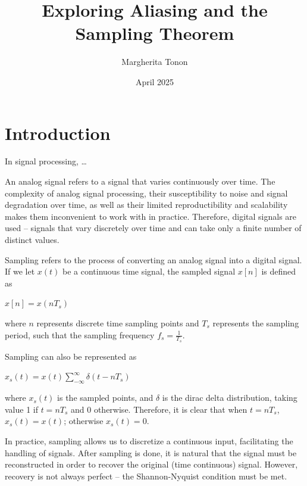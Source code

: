 \documentclass{article}
\title{Exploring Aliasing and the Sampling Theorem} %
\author{Margherita Tonon}
\date{April 2025}
\begin{document}
\maketitle

\section{Introduction}
In signal processing, \dots %

An analog signal refers to a signal that varies continuously over time. 
The complexity of analog signal processing, their susceptibility to noise and signal degradation over time, as well as their limited reproductibility and scalability makes them inconvenient to work with in practice. 
Therefore, digital signals are used -- signals that vary discretely over time and can take only a finite number of distinct values.

Sampling refers to the process of converting an analog signal into a digital signal. If we let $x(t)$ be a continuous time signal, the sampled signal $x[n]$ is defined as
\begin{center}
    \begin{math}
        x[n] = x(nT_s)
    \end{math}  
\end{center}
where $n$ represents discrete time sampling points and $T_s$ represents the sampling period, such that the sampling frequency $f_s = \frac{1}{T_s}$.

Sampling can also be represented as 
\begin{center}
    \begin{math}
        x_s(t) = x(t) \sum_{-\infty}^{\infty} \delta (t-nT_s)
    \end{math}  
\end{center}
where $x_s(t)$ is the sampled points, and $\delta$ is the dirac delta distribution, taking value 1 if $t=nT_s$ and 0 otherwise.
Therefore, it is clear that when $t=nT_s$, $x_s(t) = x(t)$; otherwise $x_s(t) = 0$. 

In practice, sampling allows us to discretize a continuous input, facilitating the handling of signals. After sampling is done, it is natural that the signal must be reconstructed in order to recover the original (time continuous) signal.
However, recovery is not always perfect -- the Shannon-Nyquist condition must be met.
\end{document}
